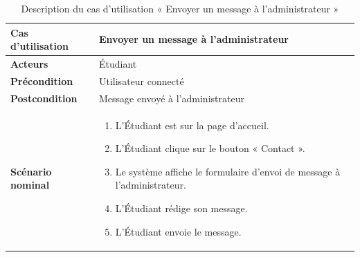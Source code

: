 \begin{sloppypar}
\begin{table}[h]
\centering
\begin{tabular}{|p{3cm}|p{12cm}|}
\hline
\textbf{Cas d'utilisation } & Envoyer un message à l'administrateur \\
\hline
\textbf{Acteurs} & Étudiant \\
\hline
\textbf{Précondition} & Utilisateur connecté \\
\hline
\textbf{Postcondition} & Message envoyé à l'administrateur \\
\hline
\textbf{Scénario nominal} & 
\begin{enumerate}
    \item L'Étudiant est sur la page d'accueil.
    \item L'Étudiant clique sur le bouton « Contact ».
    \item Le système affiche le formulaire d'envoi de message à l'administrateur.
    \item L'Étudiant rédige son message.
    \item L'Étudiant envoie le message.
\end{enumerate} \\
\hline
\end{tabular}
\caption{Description du cas d’utilisation « Envoyer un message à l'administrateur »}
\end{table}
\vspace{-9mm}

\end{sloppypar}
